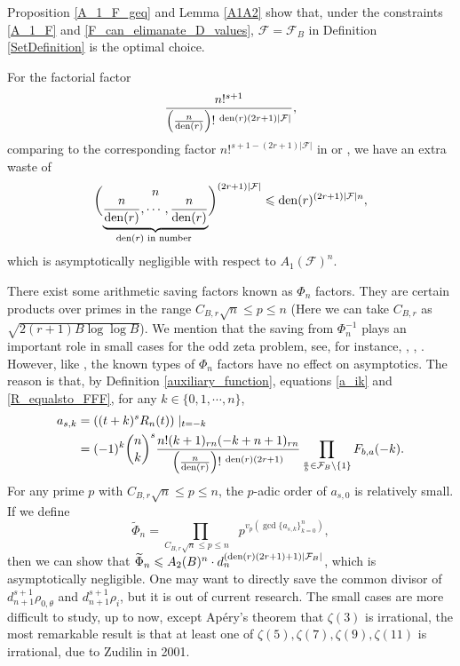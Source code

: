 \documentclass[11pt]{amsart}
\numberwithin{equation}{section}
\begin{document}
Proposition \ref{A_1_F_geq} and Lemma \ref{A1A2} show that, under the constraints \eqref{A_1_F} and \eqref{F_can_elimanate_D_values}, $\mathcal{F} = \mathcal{F}_B$ in Definition \ref{SetDefinition} is the optimal choice.

For the factorial factor
\[ \frac{n!^{s+1}}{\left( \frac{n}{{\rm den}(r)} \right)!~^{{\rm den}(r)(2r+1)|\mathcal{F}|}}, \]
comparing to the corresponding factor $n!^{s+1-(2r+1)|\mathcal{F}|}$ in \cite{BR01} or \cite{FSZ2019}, we have an extra waste of
\[ \binom{n}{ \underbrace{\frac{n}{{\rm den}(r)},\cdots,\frac{n}{{\rm den}(r)}}_{{\rm den}(r) \text{~in number~}}}^{(2r+1)|\mathcal{F}|} \leqslant {\rm den}(r)^{(2r+1)|\mathcal{F}|n}, \]
which is asymptotically negligible with respect to $A_1(\mathcal{F})^n$.

There exist some arithmetic saving factors known as $\Phi_n$ factors. They are certain products over primes in the range $C_{B,r} \sqrt{n} \leqslant p \leqslant n$ (Here we can take $C_{B,r}$ as $\sqrt{2(r+1)B\log\log B}$). We mention that the saving from $\Phi_n^{-1}$ plays an important role in small cases for the odd zeta problem, see, for instance, \cite{Zu01,RZ18}, \cite[\S 4]{Zu02}, \cite[Chapitre 11]{KR07}. However, like \cite[Remark 2]{FSZ2019}, the known types of $\Phi_n$ factors have no effect on asymptotics. The reason is that, by Definition \ref{auxiliary_function}, equations \eqref{a_ik} and \eqref{R_equalsto_FFF}, for any $k \in \{ 0,1,\cdots,n \}$,
\begin{align*}
 a_{s,k} &= \left( (t+k)^s R_n(t) \right) \mid_{t=-k}  \\
 &= (-1)^{k}\binom{n}{k}^s \frac{n!(k+1)_{rn}(-k+n+1)_{rn}}{ \left( \frac{n}{ {\rm den}(r)} \right)!~^{{\rm den}(r)(2r+1)} } \prod_{\frac{a}{b} \in \mathcal{F}_B \setminus \{1\} } F_{b,a}(-k).
\end{align*}
For any prime $p$ with $C_{B,r} \sqrt{n} \leqslant p \leqslant n$, the $p$-adic order of $a_{s,0}$ is relatively small. If we define
\[ \widetilde{\Phi}_n =  \prod_{C_{B,r} \sqrt{n} \leqslant p \leqslant n~~~~} p^{v_p(\gcd\{ a_{s,k} \}_{k=0}^{n} )}, \]
then we can show that $\widetilde{\Phi}_n \leqslant A_2(B)^n \cdot d_n^{({\rm den}(r)(2r+1) + 1)|\mathcal{F}_B|}$, which is asymptotically negligible. One may want to directly save the common divisor of $d_{n+1}^{s+1}\rho_{0, \theta}$ and $d_{n+1}^{s+1}\rho_i$, but it is out of current research. The small cases are more difficult to study, up to now, except Ap{\' e}ry's theorem \cite{Ap79} that $\zeta(3)$ is irrational, the most remarkable result is that at least one of $\zeta(5),\zeta(7),\zeta(9),\zeta(11)$ is irrational, due to Zudilin \cite{Zu01} in 2001.
\end{document}
